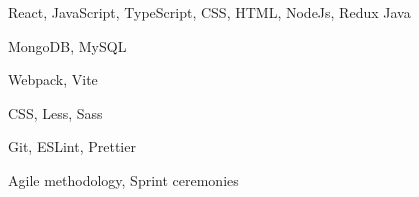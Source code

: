 

\begin{cvskills}

  \cvskill
    {React, JavaScript, TypeScript, CSS, HTML, NodeJs, Redux Java} %
    {} %

  \cvskill
    {MongoDB, MySQL} %
    {} %


  \cvskill
    {Webpack, Vite} %
    {} %

  \cvskill
    {CSS, Less, Sass} %
    {} %

  \cvskill
    {Git, ESLint, Prettier} %
    {} %

  \cvskill
    {Agile methodology, Sprint ceremonies} %
    {} %

\end{cvskills}
